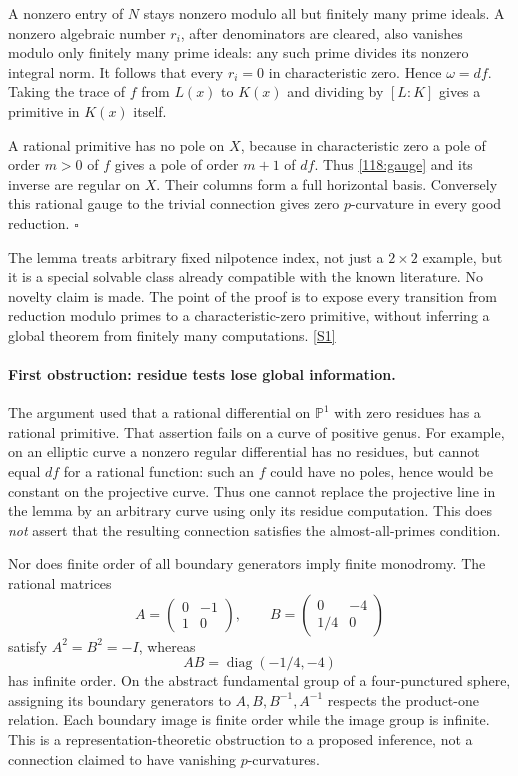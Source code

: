 \documentclass[11pt,a4paper]{article}
\newcommand{\PP}{\mathbb P}
\newcommand{\sref}[2]{\hyperlink{source:#1:#2}{[S#2]}}
\numberwithin{equation}{section}
\begin{document}
A nonzero entry of $N$ stays nonzero modulo all but finitely many prime
ideals. A nonzero algebraic number $r_i$, after denominators are cleared,
also vanishes modulo only finitely many prime ideals: any such prime divides
its nonzero integral norm. It follows that every $r_i=0$ in characteristic
zero. Hence $\omega=df$. Taking the trace of $f$ from $L(x)$ to $K(x)$ and
dividing by $[L:K]$ gives a primitive in $K(x)$ itself.

A rational primitive has no pole on $X$, because in characteristic zero a
pole of order $m>0$ of $f$ gives a pole of order $m+1$ of $df$. Thus
\eqref{118:gauge} and its inverse are regular on $X$. Their columns form a
full horizontal basis. Conversely this rational gauge to the trivial
connection gives zero $p$-curvature in every good reduction. $\square$

The lemma treats arbitrary fixed nilpotence index, not just a $2\times2$
example, but it is a special solvable class already compatible with the
known literature. No novelty claim is made. The point of the proof is to
expose every transition from reduction modulo primes to a characteristic-zero
primitive, without inferring a global theorem from finitely many computations.
\sref{118}{1}

\paragraph{First obstruction: residue tests lose global information.}
The argument used that a rational differential on $\PP^1$ with zero residues
has a rational primitive. That assertion fails on a curve of positive genus.
For example, on an elliptic curve a nonzero regular differential has no
residues, but cannot equal $df$ for a rational function: such an $f$ could
have no poles, hence would be constant on the projective curve. Thus one
cannot replace the projective line in the lemma by an arbitrary curve using
only its residue computation. This does \emph{not} assert that the resulting
connection satisfies the almost-all-primes condition.

Nor does finite order of all boundary generators imply finite monodromy.
The rational matrices
\begin{equation}\label{118:matrices}
 A=\begin{pmatrix}0&-1\\1&0\end{pmatrix},\qquad
 B=\begin{pmatrix}0&-4\\1/4&0\end{pmatrix}
\end{equation}
satisfy $A^2=B^2=-I$, whereas
\[
 AB=\operatorname{diag}(-1/4,-4)
\]
has infinite order. On the abstract fundamental group of a four-punctured
sphere, assigning its boundary generators to $A,B,B^{-1},A^{-1}$ respects
the product-one relation. Each boundary image is finite order while the
image group is infinite. This is a representation-theoretic obstruction to
a proposed inference, not a connection claimed to have vanishing
$p$-curvatures.
\end{document}
